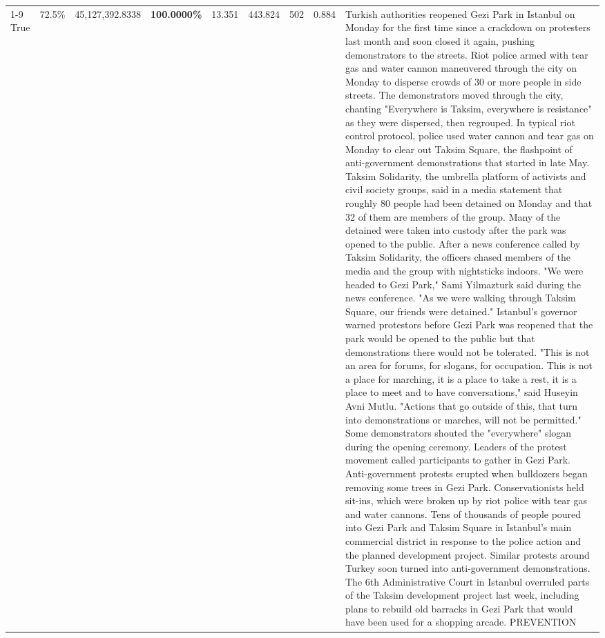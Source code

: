 \begin{table}[H]
\begin{tabular}{lllrlllll}
\cline{1-9}
True & 72.5\% & 45,127,392.8338 & \bfseries \color{red} 100.0000\% & 13.351 & 443.824 & 502 & 0.884 & Turkish authorities reopened Gezi Park in Istanbul on Monday for the first time since a crackdown on protesters last month and soon closed it again, pushing demonstrators to the streets. Riot police armed with tear gas and water cannon maneuvered through the city on Monday to disperse crowds of 30 or more people in side streets. The demonstrators moved through the city, chanting "Everywhere is Taksim, everywhere is resistance" as they were dispersed, then regrouped. In typical riot control protocol, police used water cannon and tear gas on Monday to clear out Taksim Square, the flashpoint of anti-government demonstrations that started in late May. Taksim Solidarity, the umbrella platform of activists and civil society groups, said in a media statement that roughly 80 people had been detained on Monday and that 32 of them are members of the group. Many of the detained were taken into custody after the park was opened to the public. After a news conference called by Taksim Solidarity, the officers chased members of the media and the group with nightsticks indoors. "We were headed to Gezi Park," Sami Yilmazturk said during the news conference. "As we were walking through Taksim Square, our friends were detained." Istanbul's governor warned protestors before Gezi Park was reopened that the park would be opened to the public but that demonstrations there would not be tolerated. "This is not an area for forums, for slogans, for occupation. This is not a place for marching, it is a place to take a rest, it is a place to meet and to have conversations," said Huseyin Avni Mutlu. "Actions that go outside of this, that turn into demonstrations or marches, will not be permitted." Some demonstrators shouted the "everywhere" slogan during the opening ceremony. Leaders of the protest movement called participants to gather in Gezi Park. Anti-government protests erupted when bulldozers began removing some trees in Gezi Park. Conservationists held sit-ins, which were broken up by riot police with tear gas and water cannons. Tens of thousands of people poured into Gezi Park and Taksim Square in Istanbul's main commercial district in response to the police action and the planned development project. Similar protests around Turkey soon turned into anti-government demonstrations. The 6th Administrative Court in Istanbul overruled parts of the Taksim development project last week, including plans to rebuild old barracks in Gezi Park that would have been used for a shopping arcade. PREVENTION \\

\end{tabular}
\end{table}
